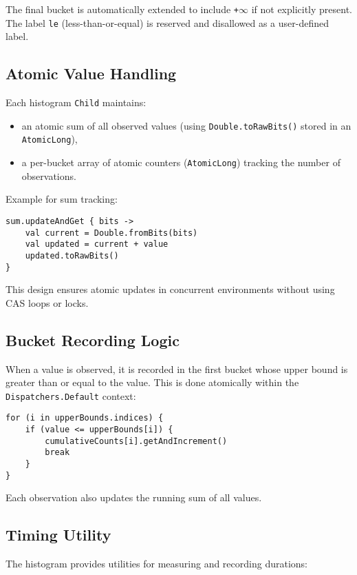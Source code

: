 The final bucket is automatically extended to include \texttt{+\(\infty\)} if not explicitly present. The label \texttt{le} (less-than-or-equal) is reserved and disallowed as a user-defined label.

\subsection{Atomic Value Handling}

Each histogram \texttt{Child} maintains:
\begin{itemize}
    \item an atomic sum of all observed values (using \texttt{Double.toRawBits()} stored in an \texttt{AtomicLong}),
    \item a per-bucket array of atomic counters (\texttt{AtomicLong}) tracking the number of observations.
\end{itemize}

Example for sum tracking:
\begin{verbatim}
sum.updateAndGet { bits ->
    val current = Double.fromBits(bits)
    val updated = current + value
    updated.toRawBits()
}
\end{verbatim}

This design ensures atomic updates in concurrent environments without using CAS loops or locks.

\subsection{Bucket Recording Logic}

When a value is observed, it is recorded in the first bucket whose upper bound is greater than or equal to the value. This is done atomically within the \texttt{Dispatchers.Default} context:

\begin{verbatim}
for (i in upperBounds.indices) {
    if (value <= upperBounds[i]) {
        cumulativeCounts[i].getAndIncrement()
        break
    }
}
\end{verbatim}

Each observation also updates the running sum of all values.

\subsection{Timing Utility}

The histogram provides utilities for measuring and recording durations:

